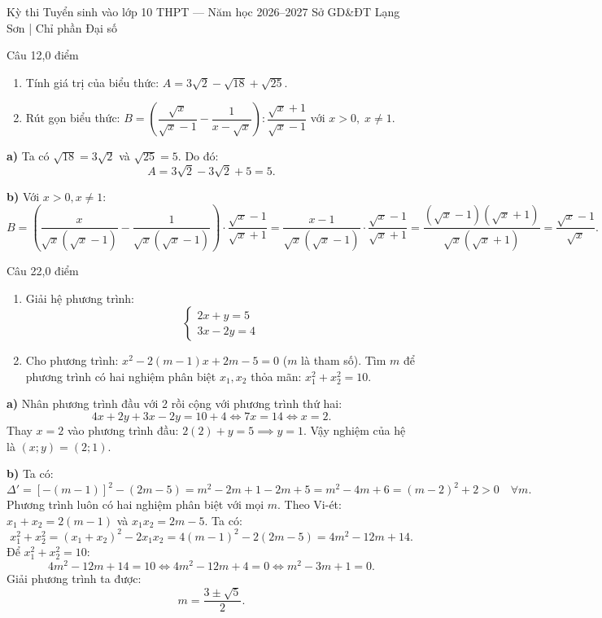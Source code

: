 ﻿%
%
  {Kỳ thi Tuyển sinh vào lớp 10 THPT — Năm học 2026--2027}%
  {Sở GD\&ĐT Lạng Sơn | Chỉ phần Đại số}

\begin{de_cau}{Câu 1}{2,0 điểm}
\begin{enumerate}[label=\alph*)]
\item Tính giá trị của biểu thức: $A = 3\sqrt{2} - \sqrt{18} + \sqrt{25}$.
\item Rút gọn biểu thức: $B = \left(\dfrac{\sqrt{x}}{\sqrt{x}-1} - \dfrac{1}{x-\sqrt{x}}\right) : \dfrac{\sqrt{x}+1}{\sqrt{x}-1}$ với $x > 0,\; x \neq 1$.
\end{enumerate}
\end{de_cau}

\begin{loi_giai_cau}
\textbf{a)} Ta có $\sqrt{18} = 3\sqrt{2}$ và $\sqrt{25} = 5$. Do đó:
\[A = 3\sqrt{2} - 3\sqrt{2} + 5 = \boxed{5}.\]

\textbf{b)} Với $x > 0, x \neq 1$:
\[B = \left(\frac{x}{\sqrt{x}(\sqrt{x}-1)} - \frac{1}{\sqrt{x}(\sqrt{x}-1)}\right) \cdot \frac{\sqrt{x}-1}{\sqrt{x}+1} = \frac{x-1}{\sqrt{x}(\sqrt{x}-1)} \cdot \frac{\sqrt{x}-1}{\sqrt{x}+1} = \frac{(\sqrt{x}-1)(\sqrt{x}+1)}{\sqrt{x}(\sqrt{x}+1)} = \boxed{\frac{\sqrt{x}-1}{\sqrt{x}}}.\]
\end{loi_giai_cau}

\begin{de_cau}{Câu 2}{2,0 điểm}
\begin{enumerate}[label=\alph*)]
\item Giải hệ phương trình: 
\[ \begin{cases} 2x + y = 5 \\ 3x - 2y = 4 \end{cases} \]
\item Cho phương trình: $x^2 - 2(m-1)x + 2m - 5 = 0$ ($m$ là tham số). Tìm $m$ để phương trình có hai nghiệm phân biệt $x_1, x_2$ thỏa mãn: $x_1^2 + x_2^2 = 10$.
\end{enumerate}
\end{de_cau}

\begin{loi_giai_cau}
\textbf{a)} Nhân phương trình đầu với 2 rồi cộng với phương trình thứ hai:
\[4x + 2y + 3x - 2y = 10 + 4 \iff 7x = 14 \iff x = 2.\]
Thay $x = 2$ vào phương trình đầu: $2(2) + y = 5 \implies y = 1$.
Vậy nghiệm của hệ là $\boxed{(x; y) = (2; 1)}$.

\textbf{b)} Ta có:
\[\Delta' = [-(m-1)]^2 - (2m-5) = m^2 - 2m + 1 - 2m + 5 = m^2 - 4m + 6 = (m-2)^2 + 2 > 0 \quad \forall m.\]
Phương trình luôn có hai nghiệm phân biệt với mọi $m$.
Theo Vi-ét: $x_1+x_2 = 2(m-1)$ và $x_1 x_2 = 2m-5$.
Ta có:
\[x_1^2 + x_2^2 = (x_1+x_2)^2 - 2x_1 x_2 = 4(m-1)^2 - 2(2m-5) = 4m^2 - 12m + 14.\]
Để $x_1^2 + x_2^2 = 10$:
\[4m^2 - 12m + 14 = 10 \iff 4m^2 - 12m + 4 = 0 \iff m^2 - 3m + 1 = 0.\]
Giải phương trình ta được:
\[\boxed{m = \dfrac{3 \pm \sqrt{5}}{2}}.\]
\end{loi_giai_cau}

